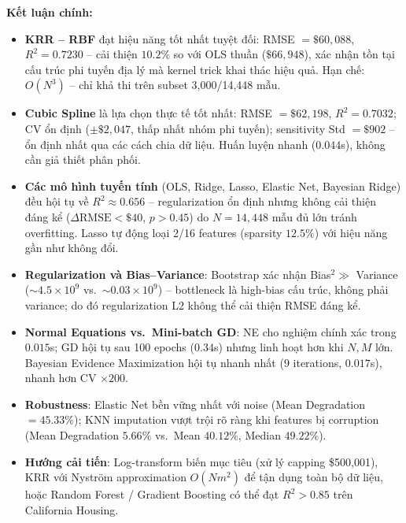 \documentclass[12pt, a4paper]{article}
\begin{document}
\textbf{Kết luận chính:}
\begin{itemize}
  \item \textbf{KRR -- RBF} đạt hiệu năng tốt nhất tuyệt đối:
        RMSE $= \$60{,}088$, $R^2 = 0.7230$ -- cải thiện $10.2\%$ so
        với OLS thuần ($\$66{,}948$), xác nhận tồn tại cấu trúc phi
        tuyến địa lý mà kernel trick khai thác hiệu quả. Hạn chế:
        $O(N^3)$ -- chỉ khả thi trên subset 3{,}000/14{,}448 mẫu.

  \item \textbf{Cubic Spline} là lựa chọn thực tế tốt nhất:
        RMSE $= \$62{,}198$, $R^2 = 0.7032$; CV ổn định
        ($\pm\$2{,}047$, thấp nhất nhóm phi tuyến); sensitivity Std
        $= \$902$ -- ổn định nhất qua các cách chia dữ liệu.
        Huấn luyện nhanh ($0.044$s), không cần giả thiết phân phối.

  \item \textbf{Các mô hình tuyến tính} (OLS, Ridge, Lasso, Elastic Net,
        Bayesian Ridge) đều hội tụ về $R^2 \approx 0.656$ --
        regularization ổn định nhưng không cải thiện đáng kể
        ($\Delta\text{RMSE} < \$40$, $p > 0.45$) do $N = 14{,}448$
        mẫu đủ lớn tránh overfitting. Lasso tự động loại 2/16 features
        (sparsity $12.5\%$) với hiệu năng gần như không đổi.

  \item \textbf{Regularization và Bias--Variance}: Bootstrap xác nhận
        Bias$^2 \gg$ Variance ($\sim 4.5 \times 10^9$ vs.\
        $\sim 0.03 \times 10^9$) -- bottleneck là high-bias cấu trúc,
        không phải variance; do đó regularization L2 không thể cải
        thiện RMSE đáng kể.

  \item \textbf{Normal Equations vs.\ Mini-batch GD}:
        NE cho nghiệm chính xác trong $0.015$s; GD hội tụ sau 100 epochs
        ($0.34$s) nhưng linh hoạt hơn khi $N, M$ lớn.
        Bayesian Evidence Maximization hội tụ nhanh nhất (9 iterations,
        $0.017$s), nhanh hơn CV $\times 200$.

  \item \textbf{Robustness}: Elastic Net bền vững nhất với noise
        (Mean Degradation $= 45.33\%$); KNN imputation vượt trội rõ
        ràng khi features bị corruption (Mean Degradation $5.66\%$
        vs.\ Mean $40.12\%$, Median $49.22\%$).

  \item \textbf{Hướng cải tiến}: Log-transform biến mục tiêu (xử lý
        capping \$500{,}001), KRR với Nyström approximation $O(Nm^2)$
        để tận dụng toàn bộ dữ liệu, hoặc Random Forest / Gradient
        Boosting có thể đạt $R^2 > 0.85$ trên California Housing.
\end{itemize}
\end{document}
